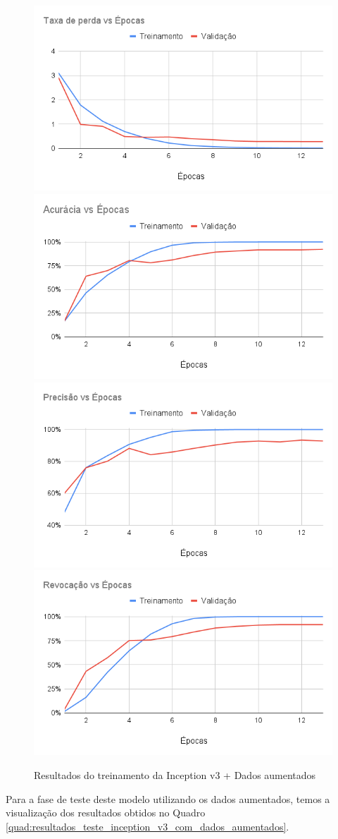 \documentclass[
	12pt,				%
	oneside,			%
	a4paper,			%
	english,			%
	brazil				%
	]{abntex2ppgsi}
\begin{document}
\begin{figure}[H]
    \centering
    \caption{Resultados do treinamento da Inception v3 + Dados aumentados}
    \includegraphics[width=.50\textwidth]{imagens/resultados_discussao/architecture/inception_v3/augmented/perda.png}\hfill
    \includegraphics[width=.50\textwidth]{imagens/resultados_discussao/architecture/inception_v3/augmented/acuracia.png}\bigbreak    \includegraphics[width=.50\textwidth]{imagens/resultados_discussao/architecture/inception_v3/augmented/precisao.png}\hfill
    \includegraphics[width=.50\textwidth]{imagens/resultados_discussao/architecture/inception_v3/augmented/revocacao.png}
    \label{fig:inception_v3_dados_aumentados}
\end{figure}

Para a fase de teste deste modelo utilizando os dados aumentados, temos a visualização dos resultados obtidos no Quadro \ref{quad:resultados_teste_inception_v3_com_dados_aumentados}.
\end{document}
